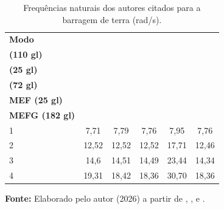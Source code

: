 \begin{table}[htbp]
    \centering
    \caption{Frequências naturais dos autores citados para a barragem de terra (rad/s).}
    \label{tab:5.9a}
    \setlength{\tabcolsep}{4pt} %
    \small %
    \begin{tabular}{lccccc}
        \toprule
        \textbf{Modo} & 
        \makecell{\textbf{\protect\citet{chopra2023dynamics}}\\\textbf{(110 gl)}} & 
        \makecell{\textbf{\protect\citet{analytictrapezoidalfourierpelementvibratingplaneproblems2004}}\\\textbf{(25 gl)}} & 
        \makecell{\textbf{\protect\citet{refinednonconformingplanequadrilateralelement2000}}\\\textbf{(72 gl)}} & 
        \makecell{\textbf{\protect\citet{cittadin2020enriquecimento}}\\\textbf{MEF (25 gl)}} & 
        \makecell{\textbf{\protect\citet{cittadin2020enriquecimento}}\\\textbf{MEFG (182 gl)}} \\
        \midrule
        1 & 7,71  & 7,79  & 7,76  & 7,95  & 7,76  \\
        2 & 12,52 & 12,52 & 12,52 & 17,71 & 12,46 \\
        3 & 14,6  & 14,51 & 14,49 & 23,44 & 14,34 \\
        4 & 19,31 & 18,42 & 18,36 & 30,70 & 18,36 \\
        \bottomrule
    \end{tabular}
    
    \vspace{0.2cm}
    \raggedright
    \textbf{Fonte:} Elaborado pelo autor (2026) a partir de \citet{chopra2023dynamics}, \citet{analytictrapezoidalfourierpelementvibratingplaneproblems2004}, \citet{refinednonconformingplanequadrilateralelement2000} e \citet{cittadin2020enriquecimento}.
\end{table}


